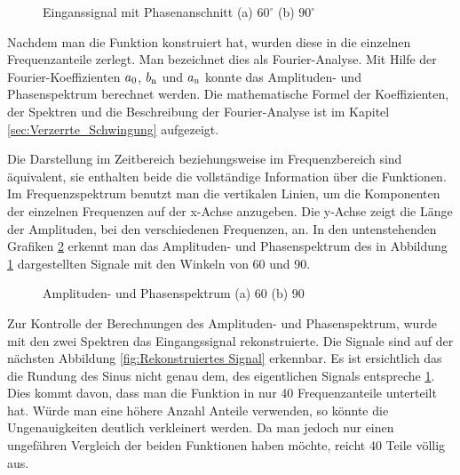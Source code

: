\begin{figure}[h]
	\centering
	\qquad
	\caption{Einganssignal mit Phasenanschnitt (a) $60^\circ$ (b) $90^\circ$}
	\label{fig:eingangssignal_mit_Matlab}
\end{figure} 


Nachdem man die Funktion konstruiert hat, wurden diese in die einzelnen Frequenzanteile zerlegt. Man bezeichnet dies als Fourier-Analyse. Mit Hilfe der Fourier-Koeffizienten $a\textsubscript{0}$, $b\textsubscript{n}$ und $a\textsubscript{n}$ konnte das Amplituden- und Phasenspektrum berechnet werden. Die mathematische Formel der Koeffizienten, der Spektren und die Beschreibung der Fourier-Analyse ist im Kapitel \ref{sec:Verzerrte_Schwingung} aufgezeigt.
  
\newpage
Die Darstellung im Zeitbereich beziehungsweise im Frequenzbereich sind äquivalent, sie enthalten beide die vollständige Information über die Funktionen. Im Frequenzspektrum benutzt man die vertikalen Linien, um die Komponenten der einzelnen Frequenzen auf der x-Achse anzugeben. Die y-Achse zeigt die Länge der Amplituden, bei den verschiedenen Frequenzen, an. In den untenstehenden Grafiken \ref{fig:Amplituden- und Phasenspektrum} erkennt man das Amplituden- und Phasenspektrum des in Abbildung \ref{fig:eingangssignal_mit_Matlab} dargestellten Signale mit den Winkeln von 60\textdegree \hspace{0.02cm} und 90\textdegree \hspace{0.02cm}.

\begin{figure}[h]
	\centering
	\qquad
	\caption{Amplituden- und Phasenspektrum (a) 60\textdegree \hspace{0.02cm} (b) 90\textdegree}
	\label{fig:Amplituden- und Phasenspektrum}
\end{figure} 

Zur Kontrolle der Berechnungen des Amplituden- und Phasenspektrum, wurde mit den zwei Spektren das Eingangssignal rekonstruierte. Die Signale sind auf der nächsten Abbildung \ref{fig:Rekonstruiertes Signal} erkennbar. Es ist ersichtlich das die Rundung des Sinus nicht genau dem, des eigentlichen Signals entspreche \ref{fig:eingangssignal_mit_Matlab}. Dies kommt davon, dass man die Funktion in \grqq nur\grqq\hspace{0.02cm} 40 Frequenzanteile unterteilt hat. Würde man eine höhere Anzahl Anteile verwenden, so könnte die Ungenauigkeiten deutlich verkleinert werden. Da man jedoch nur einen ungefähren Vergleich der beiden Funktionen haben möchte, reicht 40 Teile völlig aus. 

